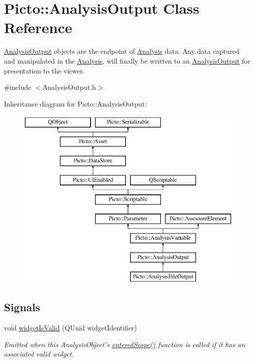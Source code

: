 \hypertarget{class_picto_1_1_analysis_output}{\section{Picto\-:\-:Analysis\-Output Class Reference}
\label{class_picto_1_1_analysis_output}
}


\hyperlink{class_picto_1_1_analysis_output}{Analysis\-Output} objects are the endpoint of \hyperlink{class_picto_1_1_analysis}{Analysis} data. Any data captured and manipulated in the \hyperlink{class_picto_1_1_analysis}{Analysis}, will finally be written to an \hyperlink{class_picto_1_1_analysis_output}{Analysis\-Output} for presentation to the viewer.  




{\ttfamily \#include $<$Analysis\-Output.\-h$>$}

Inheritance diagram for Picto\-:\-:Analysis\-Output\-:\begin{figure}[H]
\begin{center}
\leavevmode
\includegraphics[height=9.000000cm]{class_picto_1_1_analysis_output}
\end{center}
\end{figure}
\subsection*{Signals}
\begin{DoxyCompactItemize}
\item 
void \hyperlink{class_picto_1_1_analysis_output_a459b96a480c7f6a4ae4fd63960f07b63}{widget\-Is\-Valid} (Q\-Uuid widget\-Identifier)
\begin{DoxyCompactList}\small\item\em Emitted when this Analysis\-Object's \hyperlink{class_picto_1_1_analysis_output_abbe842b6e1021e719ebe7f6aeab6179c}{entered\-Scope()} function is called if it has an associated valid widget. \end{DoxyCompactList}\end{DoxyCompactItemize}

